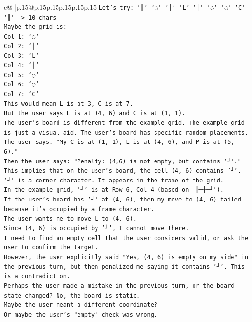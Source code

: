 \documentclass{article}
\begin{document}
{\begin{supertabular}{c@{$\;$}|p{.15\linewidth}@{}p{.15\linewidth}p{.15\linewidth}p{.15\linewidth}p{.15\linewidth}p{.15\linewidth}}
{{{\texttt{Let's try: `║` `◌` `│` `L` `│` `◌` `◌` `C` `║` {-}> 10 chars.} \\
\texttt{Maybe the grid is:} \\
\texttt{Col 1: `◌`} \\
\texttt{Col 2: `│`} \\
\texttt{Col 3: `L`} \\
\texttt{Col 4: `│`} \\
\texttt{Col 5: `◌`} \\
\texttt{Col 6: `◌`} \\
\texttt{Col 7: `C`} \\
\texttt{This would mean L is at 3, C is at 7.} \\
\texttt{But the user says L is at (4, 6) and C is at (1, 1).} \\
\texttt{The user's board is different from the example grid. The example grid is just a visual aid. The user's board has specific random placements.} \\
\texttt{The user says: "My C is at (1, 1), L is at (4, 6), and P is at (5, 6)."} \\
\texttt{Then the user says: "Penalty: (4,6) is not empty, but contains '┘'."} \\
\texttt{This implies that on the user's board, the cell (4, 6) contains '┘'.} \\
\texttt{'┘' is a corner character. It appears in the frame of the grid.} \\
\texttt{In the example grid, '┘' is at Row 6, Col 4 (based on `╟─┼─┘`).} \\
\texttt{If the user's board has '┘' at (4, 6), then my move to (4, 6) failed because it's occupied by a frame character.} \\
\texttt{The user wants me to move L to (4, 6).} \\
\texttt{Since (4, 6) is occupied by '┘', I cannot move there.} \\
\texttt{I need to find an empty cell that the user considers valid, or ask the user to confirm the target.} \\
\texttt{However, the user explicitly said "Yes, (4, 6) is empty on my side" in the previous turn, but then penalized me saying it contains '┘'. This is a contradiction.} \\
\texttt{Perhaps the user made a mistake in the previous turn, or the board state changed? No, the board is static.} \\
\texttt{Maybe the user meant a different coordinate?} \\
\texttt{Or maybe the user's "empty" check was wrong.} \\
}}}
\end{supertabular}}
\end{document}
